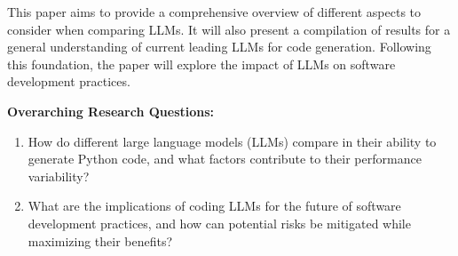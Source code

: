 This paper aims to provide a comprehensive overview of different aspects to consider when comparing LLMs.  It will also present a compilation of results for a general understanding of current leading LLMs for code generation. Following this foundation, the paper will explore the impact of LLMs on software development practices.



\textbf{Overarching Research Questions:}

\begin{enumerate}
  \item How do different large language models (LLMs) compare in their ability to generate Python code, and what factors contribute to their performance variability?
  \item What are the implications of coding LLMs for the future of software development practices, and how can potential risks be mitigated while maximizing their benefits?
\end{enumerate}